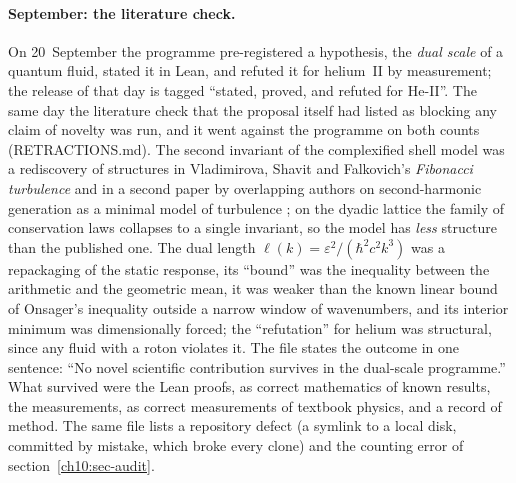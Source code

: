 \paragraph{September: the literature check.} On 20~September the programme pre-registered a hypothesis, the \emph{dual scale} of a quantum fluid,
stated it in Lean, and refuted it for helium~II by measurement; the release of that day is tagged ``stated, proved, and refuted for He-II''. The same
day the literature check that the proposal itself had listed as blocking any claim of novelty was run, and it went against the programme on both
counts (RETRACTIONS.md). The second invariant of the complexified shell model was a rediscovery of structures in Vladimirova, Shavit and Falkovich's
\emph{Fibonacci turbulence} and in a second paper by overlapping authors on second-harmonic generation as a minimal model of turbulence
\cite{Vladimirova2021a,Vladimirova2021b}; on the dyadic lattice the family of conservation laws collapses to a single invariant, so the model has
\emph{less} structure than the published one. The dual length $\ell(k)=\varepsilon^2/(\hbar^2c^2k^3)$ was a repackaging of the static response, its
``bound'' was the inequality between the arithmetic and the geometric mean, it was weaker than the known linear bound of Onsager's inequality
\cite{WreszinskiDaSilva2005} outside a narrow window of wavenumbers, and its interior minimum was dimensionally forced; the ``refutation'' for helium
was structural, since any fluid with a roton violates it. The file states the outcome in one sentence: ``No novel scientific contribution survives
in the dual-scale programme.'' What survived were the Lean proofs, as correct mathematics of known results, the measurements, as correct measurements
of textbook physics, and a record of method. The same file lists a repository defect (a symlink to a local disk, committed by mistake, which broke every
clone) and the counting error of section~\ref{ch10:sec-audit}.

